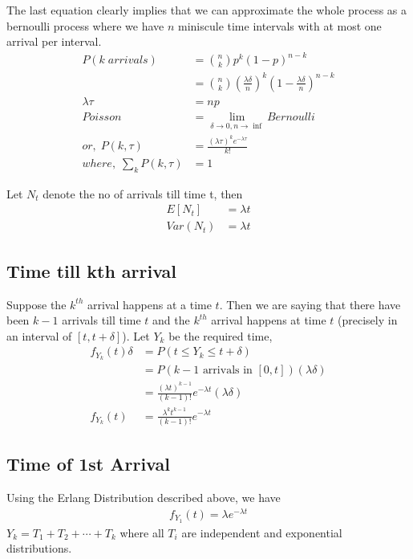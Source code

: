 \documentclass[../probability-notes.tex]{subfiles}
\begin{document}
    The last equation clearly implies that we can approximate the whole process as a bernoulli process where we have $n$ miniscule time intervals with at most one arrival per interval.
    \begin{align*}
        P(k\; arrivals) &= \binom{n}{k} p^{k} (1-p)^{n-k} \\
            &= \binom{n}{k} (\frac{\lambda \delta}{n})^{k} (1 - \frac{\lambda \delta}{n})^{n-k}\\
        \lambda \tau &= np \tag*{or, arrival rate * time = E[arrivals]}\\
        Poisson &= \lim_{\delta \to 0, n \to \inf} Bernoulli\\
        or,\; P(k, \tau) &= \frac{(\lambda \tau)^{k} e^{-\lambda \tau}}{k!} \tag*{$k = 0,1, \cdots$, for a given $\tau$}\\
        where,\; \sum_{k} P(k, \tau) &= 1 \tag*{for a given $\tau$}
    \end{align*}

    Let $N_{t}$ denote the no of arrivals till time t, then
    \begin{align*}
        E[N_{t}] &= \lambda t\\
        Var(N_{t}) &= \lambda t
    \end{align*}

    \subsection{Time till kth arrival}
    Suppose the $k^{th}$ arrival happens at a time $t$. Then we are saying that there have been $k-1$ arrivals till time $t$ and the $k^{th}$ arrival happens at time $t$ (precisely in an interval of $[t, t+\delta]$). Let $Y_{k}$ be the required time,
    \begin{align*}
        f_{Y_{k}}(t)\delta &= P(t \leq Y_{k} \leq t+\delta)\\
                    &= P(\text{$k-1$ arrivals  in $[0,t]$}) (\lambda \delta)\\
                    &= \frac{(\lambda t)^{k-1}}{(k-1)!}e^{-\lambda t}(\lambda \delta)\\
        f_{Y_{k}}(t) &= \frac{\lambda^{k} t^{k-1}}{(k-1)!}e^{-\lambda t} \tag*{Erland Distribution}
    \end{align*}

    \subsection{Time of 1st Arrival}
    Using the Erlang Distribution described above, we have
    \begin{align*}
        f_{Y_{1}}(t) = \lambda e^{-\lambda t}
    \end{align*}
    $Y_{k} = T_{1} + T_{2} + \cdots + T_{k}$ where all $T_{i}$ are independent and exponential distributions.
\end{document}
